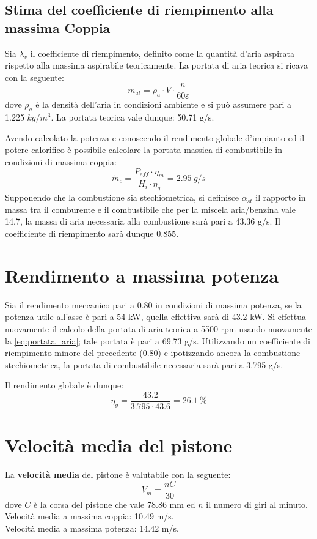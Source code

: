 \documentclass[a4paper,12pt]{article}
\begin{document}
\subsection{Stima del coefficiente di riempimento alla massima Coppia}
Sia $\lambda_v$ il coefficiente di riempimento, definito come la quantità d'aria aspirata rispetto alla massima aspirabile teoricamente.
La portata di aria teorica si ricava con la seguente:
\begin{equation}
    \label{eq:portata_aria}
    \dot m_{at} = \rho_a \cdot V \cdot \frac{n}{60\varepsilon}
\end{equation}
dove $\rho_a$ è la densità dell'aria in condizioni ambiente e si può assumere pari a 1.225 $kg/m^3$.
La portata teorica vale dunque: 50.71 g/s.

Avendo calcolato la potenza e conoscendo il rendimento globale d'impianto ed il potere calorifico è possibile calcolare la portata massica di combustibile
in condizioni di massima coppia: 
\begin{equation}
    \dot m_c = \frac{P_{eff}\cdot \eta_m}{H_i\cdot \eta_g} = 2.95\ g/s
\end{equation}
Supponendo che la combustione sia stechiometrica, si definisce $\alpha_{st}$ il rapporto in massa tra il comburente e il combustibile che per la miscela aria/benzina
vale 14.7, la massa di aria necessaria alla combustione sarà pari a 43.36 g/s. Il coefficiente di riempimento sarà dunque 0.855.

\section{Rendimento a massima potenza}
Sia il rendimento meccanico pari a 0.80 in condizioni di massima potenza, se la potenza utile all'asse è pari a 54 kW, quella effettiva sarà di 43.2 kW.
Si effettua nuovamente il calcolo della portata di aria teorica a 5500 rpm usando nuovamente la \eqref{eq:portata_aria};
tale portata è pari a 69.73 g/s. Utilizzando un coefficiente di riempimento minore del precedente (0.80) e ipotizzando ancora la combustione stechiometrica,
la portata di combustibile necessaria sarà pari a 3.795 g/s.

Il rendimento globale è dunque:
\begin{equation*}
    \eta_g = \frac{43.2}{3.795\cdot 43.6} = 26.1\ \%
\end{equation*}

\section{Velocità media del pistone}
La \textbf{velocità media} del pistone è valutabile con la seguente:
\begin{equation}
    V_m = \frac{nC}{30}    
\end{equation}
dove $C$ è la corsa del pistone che vale 78.86 mm ed $n$ il numero di giri al minuto. \\
Velocità media a massima coppia: 10.49 m/s. \\
Velocità media a massima potenza: 14.42 m/s. 
\end{document}
